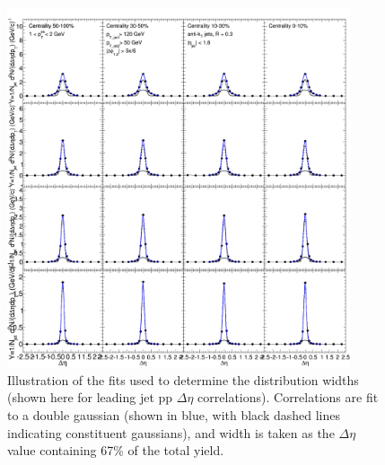 \begin{figure}[hbtp]
\begin{center}


\includegraphics[width=0.9\textwidth]{figures/Appendices/Width_Check_Fits_Eta_pp_Leading.png}

\caption[Width determination for pp leading jets]{Illustration of the fits used to determine the distribution widths (shown here for leading jet pp $\Delta\eta$ correlations).  Correlations are fit to a double gaussian (shown in blue, with black dashed lines indicating constituent gaussians), and width is taken as the $\Delta\eta$ value containing 67\% of the total yield. }
\label{fig:Width_check_fit_pp_lead}
\end{center}
\end{figure}



